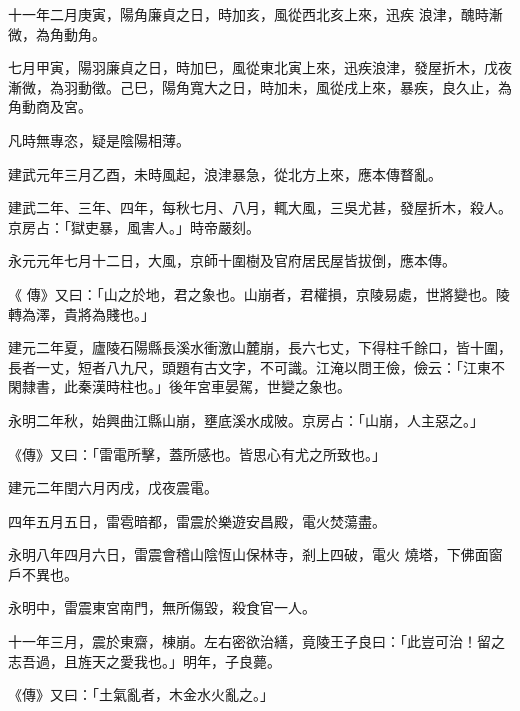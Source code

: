 \begin{pinyinscope}
 十一年二月庚寅，陽角廉貞之日，時加亥，風從西北亥上來，迅疾
 浪津，醜時漸微，為角動角。



 七月甲寅，陽羽廉貞之日，時加巳，風從東北寅上來，迅疾浪津，發屋折木，戊夜漸微，為羽動徵。己巳，陽角寬大之日，時加未，風從戌上來，暴疾，良久止，為角動商及宮。



 凡時無專恣，疑是陰陽相薄。



 建武元年三月乙酉，未時風起，浪津暴急，從北方上來，應本傳瞀亂。



 建武二年、三年、四年，每秋七月、八月，輒大風，三吳尤甚，發屋折木，殺人。京房占：「獄吏暴，風害人。」時帝嚴刻。



 永元元年七月十二日，大風，京師十圍樹及官府居民屋皆拔倒，應本傳。



 《
 傳》又曰：「山之於地，君之象也。山崩者，君權損，京陵易處，世將變也。陵轉為澤，貴將為賤也。」



 建元二年夏，廬陵石陽縣長溪水衝激山麓崩，長六七丈，下得柱千餘口，皆十圍，長者一丈，短者八九尺，頭題有古文字，不可識。江淹以問王儉，儉云：「江東不閑隸書，此秦漢時柱也。」後年宮車晏駕，世變之象也。



 永明二年秋，始興曲江縣山崩，壅底溪水成陂。京房占：「山崩，人主惡之。」



 《傳》又曰：「雷電所擊，蓋所感也。皆思心有尤之所致也。」



 建元二年閏六月丙戌，戊夜震電。



 四年五月五日，雷雹暗都，雷震於樂遊安昌殿，電火焚蕩盡。



 永明八年四月六日，雷震會稽山陰恆山保林寺，剎上四破，電火
 燒塔，下佛面窗戶不異也。



 永明中，雷震東宮南門，無所傷毀，殺食官一人。



 十一年三月，震於東齋，棟崩。左右密欲治繕，竟陵王子良曰：「此豈可治！留之志吾過，且旌天之愛我也。」明年，子良薨。



 《傳》又曰：「土氣亂者，木金水火亂之。」




\end{pinyinscope}
